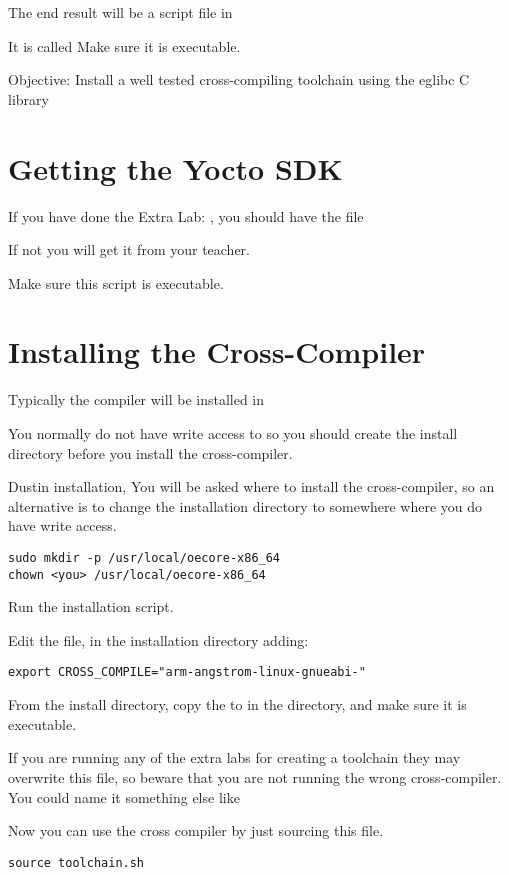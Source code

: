 The end result will be a script file in 

It is called 
Make sure it is executable.

  {Objective: Install a well tested cross-compiling toolchain using the eglibc C
  library}

\section{Getting the Yocto SDK}

If you have done the Extra Lab: , 
you should have the file


If not you will get it from your teacher.

Make sure this script is executable.

\section{Installing the Cross-Compiler}

Typically the compiler will be installed in 

You normally do not have write access to  so you should
create the install directory before you install the cross-compiler.

Dustin installation, You will be asked where to install the cross-compiler, so an alternative 
is to change the installation directory to somewhere where you do have write access.

\begin{verbatim}
sudo mkdir -p /usr/local/oecore-x86_64
chown <you> /usr/local/oecore-x86_64
\end{verbatim}

Run the installation script.

Edit the  file, 
in the installation directory adding:

\begin{verbatim}
export CROSS_COMPILE="arm-angstrom-linux-gnueabi-"
\end{verbatim}


From the install directory, copy the 
 to
 in the \labdir directory, and make sure it is executable.

If you are running any of the extra labs for creating a toolchain
they may overwrite this file, so beware that you are not running
the wrong cross-compiler. You could name it something else like

Now you can use the cross compiler by just sourcing this file.

\begin{verbatim}
source toolchain.sh
\end{verbatim}

